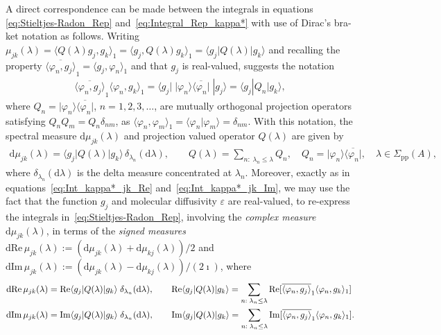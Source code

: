 \documentclass[leqno,onefignum,onetabnum]{siamltex1213}
\renewcommand{\d}{\mathrm{d}}
\newcommand{\Sigp}{\Sigma_{\text{pp}}}
\begin{document}
A direct correspondence can be made between the integrals in equations
\eqref{eq:Stieltjes-Radon_Rep} and~\eqref{eq:Integral_Rep_kappa*} with
use of Dirac's bra-ket notation as follows. Writing  
$\mu_{jk}(\lambda)=\langle Q(\lambda)g_j,g_k\rangle_1=\langle g_j,Q(\lambda)g_k\rangle_1=\langle g_j|Q(\lambda)|g_k\rangle$ and
recalling the property
$\overline{\langle\varphi_n,g_j\rangle}_1=\langle g_j,\varphi_n\rangle_1$ and that $g_j$ is real-valued, suggests  
the notation  
%
\begin{align}\label{eq:Disc_Meas_Weights}
  \overline{\langle\varphi_n,g_j\rangle}_1\langle\varphi_n,g_k\rangle_1
  =\langle g_j|\;|\varphi_n\rangle\overline{\langle\varphi_n|}\;|g_j\rangle
  =\langle g_j|Q_n|g_k\rangle,
\end{align}
%
where $Q_n=|\varphi_n\rangle\overline{\langle\varphi_n|}$, $n=1,2,3,\ldots$, are mutually orthogonal
projection operators satisfying $Q_nQ_m=Q_n\delta_{nm}$, as
$\langle\varphi_n,\varphi_m\rangle_1=\langle\varphi_n|\varphi_m\rangle=\delta_{nm}$. With this notation, the spectral
measure $\d\mu_{jk}(\lambda)$ and projection valued operator $Q(\lambda)$ are
given by   
%
\begin{align}\label{eq:Disc_Spec_Measure_Inf}
  \d\mu_{jk}(\lambda)=\langle g_j|Q(\lambda)|g_k\rangle\,\delta_{\lambda_n}(\d\lambda),\qquad
  Q(\lambda)=\sum_{n:\;\lambda_n\leq\lambda}Q_n, \quad
  Q_n=|\varphi_n\rangle\overline{\langle\varphi_n|},\quad
  \lambda\in\Sigp(A),
\end{align}
%
where $\delta_{\lambda_n}(\d\lambda)$ is the delta measure concentrated at
$\lambda_n$. Moreover, exactly as in equations~\eqref{eq:Int_kappa*_jk_Re}
and~\eqref{eq:Int_kappa*_jk_Im}, we may use the fact that the function
$g_j$ and molecular diffusivity $\varepsilon$ are real-valued, to
re-express the integrals in~\eqref{eq:Stieltjes-Radon_Rep}, involving
the \emph{complex measure} $\d\mu_{jk}(\lambda)$, in terms of the \emph{signed
  measures} $\d\text{Re}\,\mu_{jk}(\lambda):=(\d\mu_{jk}(\lambda)+\d\mu_{kj}(\lambda))/2$ and
$\d\text{Im}\,\mu_{jk}(\lambda):=(\d\mu_{jk}(\lambda)-\d\mu_{kj}(\lambda))/(2\imath)$, where
%
\begin{align}\label{eq:Disc_Spec_Measure_Inf_Re_Im}
  \d\text{Re}\,\mu_{jk}(\lambda)&=\text{Re}\langle g_j|Q(\lambda)|g_k\rangle\;\delta_{\lambda_n}(\d\lambda),
  \qquad
  \text{Re}\langle g_j|Q(\lambda)|g_k\rangle=\sum_{n:\;\lambda_n\leq\lambda}\text{Re}[\overline{\langle\varphi_n,g_j\rangle}_1\langle\varphi_n,g_k\rangle_1]
  \\
  \d\text{Im}\,\mu_{jk}(\lambda)&=\text{Im}\langle g_j|Q(\lambda)|g_k\rangle\;\delta_{\lambda_n}(\d\lambda),
  \qquad
  \text{Im}\langle g_j|Q(\lambda)|g_k\rangle=\sum_{n:\;\lambda_n\leq\lambda}\text{Im}[\overline{\langle\varphi_n,g_j\rangle}_1\langle\varphi_n,g_k\rangle_1].
  \notag
\end{align}
%
\end{document}
